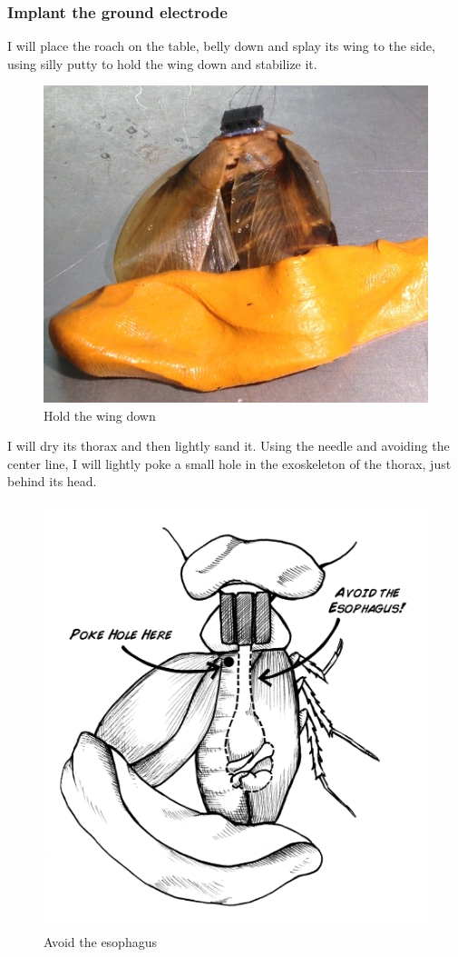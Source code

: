 \subsubsection{Implant the ground electrode}
I will place the roach on the table, belly down and splay its wing to the side, using silly putty to hold the wing down and stabilize it. 
{\begin{figure}[ht!]
\centering
\includegraphics[scale=0.5]{Surgery Photos/putty.jpg}
\caption{Hold the wing down}
\label{fig:putty}
\end{figure}}
I will dry its thorax and then lightly sand it. Using the needle and avoiding the center line, I will lightly poke a small hole in the exoskeleton of the thorax, just behind its head. 
{\begin{figure}[ht!]
\centering
\includegraphics[scale=0.5]{Surgery Photos/avoidesoph.jpg}
\caption{Avoid the esophagus}
\label{fig:avoidesoph}
\end{figure}}
